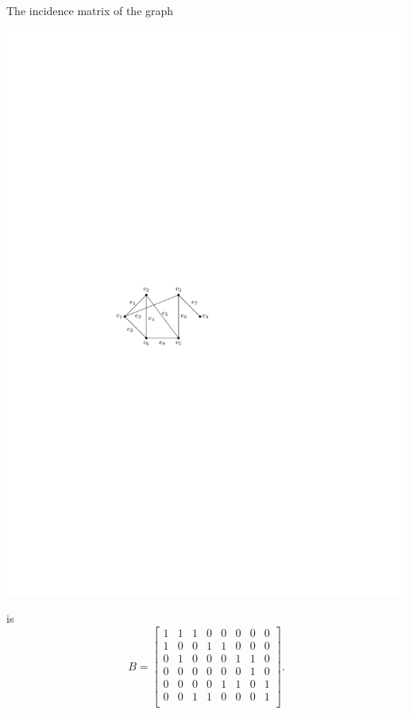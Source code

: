 \begin{Example}\label{ex:GNM(6-8)AdjMat}
The incidence matrix of the graph
\begin{center}
\includegraphics{Images/GNM(6,8).pdf}
\end{center}
is
\begin{equation*}
B = \begin{bmatrix}
1 & 1 & 1 & 0 & 0 & 0 & 0 & 0 \\
1 & 0 & 0 & 1 & 1 & 0 & 0 & 0 \\
0 & 1 & 0 & 0 & 0 & 1 & 1 & 0 \\
0 & 0 & 0 & 0 & 0 & 0 & 1 & 0 \\
0 & 0 & 0 & 0 & 1 & 1 & 0 & 1 \\
0 & 0 & 1 & 1 & 0 & 0 & 0 & 1 \\
\end{bmatrix}.
\end{equation*}
\end{Example}

